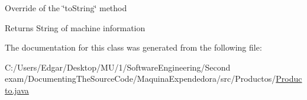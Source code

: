 Override of the \char`\"{}to\+String\char`\"{} method \begin{DoxyReturn}{Returns}
String of machine information 
\end{DoxyReturn}


The documentation for this class was generated from the following file\+:\begin{DoxyCompactItemize}
\item 
C\+:/\+Users/\+Edgar/\+Desktop/\+M\+U/1/\+Software\+Engineering/\+Second exam/\+Documenting\+The\+Source\+Code/\+Maquina\+Expendedora/src/\+Productos/\mbox{\hyperlink{_producto_8java}{Producto.\+java}}\end{DoxyCompactItemize}
